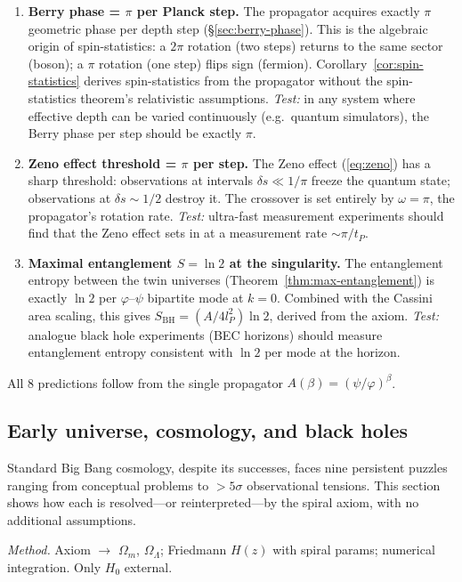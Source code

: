 \documentclass[12pt,a4paper]{article}
\begin{document}
\begin{enumerate}
\item \textbf{Berry phase = $\pi$ per Planck step.} The propagator acquires exactly $\pi$ geometric phase per depth step (\S\ref{sec:berry-phase}).  This is the algebraic origin of spin-statistics: a $2\pi$ rotation (two steps) returns to the same sector (boson); a $\pi$ rotation (one step) flips sign (fermion).  Corollary~\ref{cor:spin-statistics} derives spin-statistics from the propagator without the spin-statistics theorem's relativistic assumptions.  \textit{Test:} in any system where effective depth can be varied continuously (e.g.\ quantum simulators), the Berry phase per step should be exactly $\pi$.

\item \textbf{Zeno effect threshold = $\pi$ per step.} The Zeno effect (\ref{eq:zeno}) has a sharp threshold: observations at intervals $\delta s \ll 1/\pi$ freeze the quantum state; observations at $\delta s \sim 1/2$ destroy it.  The crossover is set entirely by $\omega = \pi$, the propagator's rotation rate.  \textit{Test:} ultra-fast measurement experiments should find that the Zeno effect sets in at a measurement rate $\sim \pi/t_P$.

\item \textbf{Maximal entanglement $S = \ln 2$ at the singularity.} The entanglement entropy between the twin universes (Theorem~\ref{thm:max-entanglement}) is exactly $\ln 2$ per $\varphi$--$\psi$ bipartite mode at $k = 0$. Combined with the Cassini area scaling, this gives $S_{\mathrm{BH}} = (A/4l_P^2)\ln 2$, derived from the axiom. \textit{Test:} analogue black hole experiments (BEC horizons) should measure entanglement entropy consistent with $\ln 2$ per mode at the horizon.
\end{enumerate}

\noindent All 8 predictions follow from the single propagator $A(\beta) = (\psi/\varphi)^\beta$.

\subsection{Early universe, cosmology, and black holes}
\label{sec:early-universe-branch}

Standard Big Bang cosmology, despite its successes, faces nine persistent puzzles ranging from conceptual problems to $>5\sigma$ observational tensions. This section shows how each is resolved---or reinterpreted---by the spiral axiom, with no additional assumptions.

\medskip\noindent\textit{Method.}\; Axiom $\to$ $\Omega_m$, $\Omega_\Lambda$; Friedmann $H(z)$ with spiral params; numerical integration. Only $H_0$ external.
\end{document}
